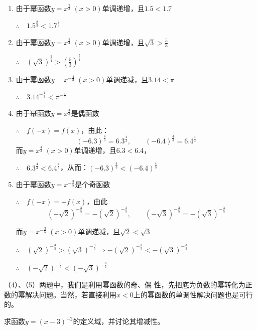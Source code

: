  \begin{solution}
 \begin{enumerate}[(1)]
     \item 由于幂函数$y=x^{\tfrac{2}{3}}\; (x>0)$单调递增，且$1.5<1.7$
 
     $\therefore\quad 1.5^{\tfrac{2}{3}} < 1.7^{\tfrac{2}{3}}$
 \item 由于幂函数$y=x^{\tfrac{5}{4}}\; (x>0)$单调递增，且$\sqrt{3}>\frac{5}{3}$
 
 $\therefore\quad \left(\sqrt{3}\right)^{\tfrac{5}{4}} > \left(\frac{5}{3}\right)^{\tfrac{5}{4}}$
 \item 由于幂函数$y=x^{-\tfrac{4}{3}}\; (x>0)$单调递减，且$3.14<\pi$
 
 $\therefore\quad 3.14^{-\tfrac{4}{3}} < \pi^{-\tfrac{4}{3}}$
 \item 由于幂函数$y=x^{\tfrac{4}{3}}$是偶函数
 
 $\therefore\quad f(-x)=f(x)$，由此：
 \[(-6.3)^{\tfrac{4}{3}}=6.3^{\tfrac{4}{3}},\qquad (-6.4)^{\tfrac{4}{3}}=6.4^{\tfrac{4}{3}}\]
 而$y=x^{\tfrac{4}{3}}\; (x>0)$单调递增，且$6.3<6.4$，
 
 $\therefore\quad 6.3^{\tfrac{4}{3}} < 6.4^{\tfrac{4}{3}}$，从而：$(-6.3)^{\tfrac{4}{3}} < (-6.4)^{\tfrac{4}{3}}$
 \item 由于幂函数$y=x^{-\tfrac{3}{5}}$是个奇函数
 
 $\therefore\quad f(-x)=-f(x)$，由此
 \[\left(-\sqrt{2}\right)^{-\tfrac{3}{5}}=-\left(\sqrt{2}\right)^{-\tfrac{3}{5}},\qquad \left(-\sqrt{3}\right)^{-\tfrac{3}{5}}=-\left(\sqrt{3}\right)^{-\tfrac{3}{5}}\]
 
 而$y=x^{-\tfrac{3}{5}}\; (x>0)$单调递减，且$\sqrt{2}<\sqrt{3}$
 
 $\therefore\quad \left(\sqrt{2}\right)^{-\tfrac{3}{5}}>\left(\sqrt{3}\right)^{-\tfrac{3}{5}}\Longrightarrow -\left(\sqrt{2}\right)^{-\tfrac{3}{5}}<-\left(\sqrt{3}\right)^{-\tfrac{3}{5}}$
 
 $\therefore\quad \left(-\sqrt{2}\right)^{-\tfrac{3}{5}}< \left(-\sqrt{3}\right)^{-\tfrac{3}{5}}$
 \end{enumerate}
 \end{solution}
 
 \begin{note}
 （4）、（5）两题中，我们是利用幂函数的奇、偶
     性，先把底为负数的幂转化为正数的幂解决问题。当然，若直接利用$x<0$上的幂函数的单调性解决问题也是可行的。
 \end{note}
 
 \begin{example}
 求函数$y=(x-3)^{-2}$的定义域，并讨论其增减性。  
 \end{example}
 
